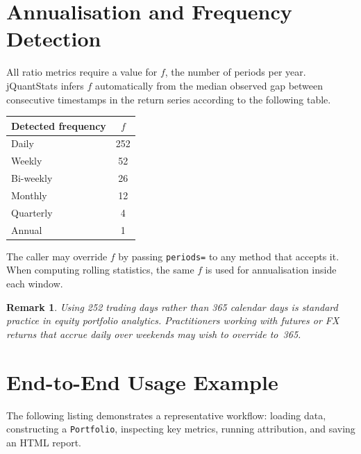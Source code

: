 \documentclass[11pt,a4paper]{article}
\newtheorem{remark}{Remark}
\begin{document}
\section{Annualisation and Frequency Detection}
\label{sec:annualisation}

All ratio metrics require a value for $f$, the number of periods per year.
jQuantStats infers $f$ automatically from the median observed gap between
consecutive timestamps in the return series according to the following table.

\begin{center}
\begin{tabular}{@{}lc@{}}
\toprule
Detected frequency & $f$ \\
\midrule
Daily         & 252 \\
Weekly        & 52  \\
Bi-weekly     & 26  \\
Monthly       & 12  \\
Quarterly     & 4   \\
Annual        & 1   \\
\bottomrule
\end{tabular}
\end{center}

The caller may override $f$ by passing \texttt{periods=} to any method that
accepts it.  When computing rolling statistics, the same $f$ is used for
annualisation inside each window.

\begin{remark}
Using 252 trading days rather than 365 calendar days is standard practice in
equity portfolio analytics.  Practitioners working with futures or FX returns
that accrue daily over weekends may wish to override to~365.
\end{remark}

\section{End-to-End Usage Example}
\label{sec:usage}

The following listing demonstrates a representative workflow: loading data,
constructing a \texttt{Portfolio}, inspecting key metrics, running attribution,
and saving an HTML report.
\end{document}
